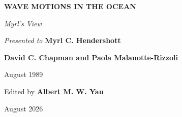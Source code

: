 
\begin{wavepdfonly}
	
	
\end{wavepdfonly}
\begin{wavewebonly}
	\thispagestyle{empty}
	\begin{center}
		\vspace*{0.78in}
		{\sffamily\color{WaveAccent}\fontsize{27}{31}\selectfont\bfseries WAVE MOTIONS IN THE OCEAN\par}
		\vspace{0.22in}
		{\fontsize{18}{22}\selectfont\itshape Myrl's View\par}
		\vspace{0.82in}
		{\large \textit{Presented to} \textbf{Myrl C. Hendershott}\par}
		\vfill
		{\large \textbf{David C. Chapman and Paola Malanotte-Rizzoli}\par}
		\vspace{0.10in}
		{\normalsize August 1989\par}
		\vfill
		{\small\sffamily Edited by \textbf{Albert M. W. Yau}\par}
		\vspace{0.08in}
		{\small\sffamily August 2026\par}
		\begin{waveepubonly}
			{\small\sffamily \waveprereleaseedition\par}
		\end{waveepubonly}
	\end{center}
\end{wavewebonly}
\clearpage
\nopagecolor

